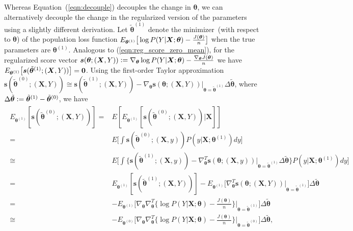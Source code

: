 \documentclass[twoside,11pt]{article}
\begin{document}
Whereas Equation~(\ref{eqn:decouple}) decouples the change in $ \bm { \theta}$, we can alternatively decouple the change in the regularized version of the parameters using a slightly different derivation. Let $\tilde{ \bm { \theta}} ^{ (1)}$ denote the minimizer~(with respect to $\bm{\theta}$) of the population loss function $\\E _{\bm { \theta}^{ (1)}} \big[ \log{ P(Y|\bm{X};\bm{\theta})} - \frac{J(\bm{\theta})}{n}\big]$ when the true parameters are $\bm { \theta} ^{ (1)}$. Analogous to (\ref{eqn:reg_score_zero_mean}), for the regularized score vector $\bm{s}(\bm{\theta};(\bm{X},Y)) \vcentcolon= \nabla_{\bm{\theta}} \log{P(Y|\bm{X};\bm{\theta})} -\frac{\nabla_{\bm{\theta}}J(\bm{\theta})}{n}$ we have $\\E _{\bm { \theta}^{ (1)}} \big[ \bm{s} (\tilde{ \bm { \theta}} ^{ (1)}; (\bm{X},Y) ) \big] = \bm{0}$. Using the first-order Taylor approximation $ \bm{s} (\tilde{ \bm { \theta}} ^{ (0)}; (\bm{X},Y) ) \cong \bm{s} (\tilde{ \bm { \theta}} ^{ (1)}; (\bm{X},Y) ) - \nabla_{\bm{\theta}} \bm{s} (\bm { \theta}; (\bm{X},Y) ) |_{\bm{\theta} = \tilde{\bm{\theta}}^{(1)}} \Delta \tilde{\bm{ \theta}}$, where $\Delta\tilde{\bm{ \theta}} \vcentcolon= \tilde{ \bm { \theta}} ^{ (1)} - \tilde{ \bm { \theta}} ^{ (0)}$, we have 
\begin{align}
\begin{aligned}
E _{\bm { \theta}^{ (1)}}[\bm{s} (\tilde{ \bm { \theta}} ^{ (0)}; (\bm{X},Y) )] 
= & E[E _{\bm { \theta}^{ (1)}}[\bm{s} (\tilde{ \bm { \theta}} ^{ (0)}; (\bm{X},Y) )| \bm {X}] ] \\
= & E\big[\int \bm{s} (\tilde{ \bm { \theta}} ^{ (0)}; (\bm{X},y)) P(y | \bm {X}; \bm{\theta} ^{ (1)}) dy \big] \\
\cong & E \big[\int \big\{ \bm{s} (\tilde{ \bm { \theta}} ^{ (1)}; (\bm{X},y)) - \nabla^T_{\bm{\theta}} \bm{s} (\bm { \theta}; (\bm{X},y) ) |_{\bm{\theta} = \tilde{\bm{\theta}}^{(1)}} \Delta \tilde{\bm{ \theta}} \big\} P(y | \bm {X}; \bm{\theta} ^{ (1)}) dy \big] \\
= & E_{\bm { \theta}^{ (1)}}[\bm{s} (\tilde{ \bm { \theta}} ^{ (1)}; (\bm{X},Y) )] - E_{\bm { \theta}^{ (1)}} \big[ \nabla^T_{\bm{\theta}} \bm{s} (\bm { \theta}; (\bm{X},Y) ) |_{\bm{\theta} = \tilde{\bm{\theta}}^{(1)}} \big] \Delta \tilde{\bm{ \theta}} \\ 
= &  - E_{\bm { \theta}^{ (1)}} \big[ \nabla_{\bm{\theta}} \nabla^T_{\bm{\theta}} \big\{ \log{P(Y | \bm{X}; \bm{\theta})} - \frac{J(\bm{\theta})}{n} \big\} |_{\bm{\theta} = \tilde{\bm{\theta}}^{(1)}} \big] \Delta \tilde{\bm{ \theta}} \\
\cong &  - E_{\bm { \theta}^{ (0)}} \big[ \nabla_{\bm{\theta}} \nabla^T_{\bm{\theta}} \big\{ \log{P(Y | \bm{X}; \bm{\theta})} - \frac{J(\bm{\theta})}{n} \big\} |_{\bm{\theta} = \tilde{\bm{\theta}}^{(0)}} \big] \Delta \tilde{\bm{ \theta}},
\end{aligned}
\label{eqn:cd_mean_shift}
\end{align}
\end{document}
